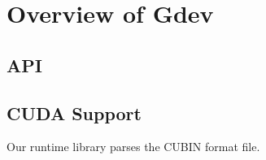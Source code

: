 \section{Overview of Gdev}

\subsection{API}

\subsection{CUDA Support}

Our runtime library parses the CUBIN format file.